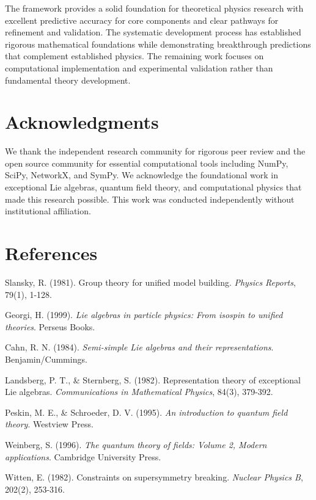 \documentclass[12pt,a4paper]{article}
\begin{document}
\begin{itemize}
\begin{itemize}
The framework provides a solid foundation for theoretical physics research with excellent predictive accuracy for core components and clear pathways for refinement and validation. The systematic development process has established rigorous mathematical foundations while demonstrating breakthrough predictions that complement established physics. The remaining work focuses on computational implementation and experimental validation rather than fundamental theory development.

\section*{Acknowledgments}

We thank the independent research community for rigorous peer review and the open source community for essential computational tools including NumPy, SciPy, NetworkX, and SymPy. We acknowledge the foundational work in exceptional Lie algebras, quantum field theory, and computational physics that made this research possible. This work was conducted independently without institutional affiliation.

\section*{References}

\begin{thebibliography}{99}

 Slansky, R. (1981). Group theory for unified model building. \textit{Physics Reports}, 79(1), 1-128.

 Georgi, H. (1999). \textit{Lie algebras in particle physics: From isospin to unified theories}. Perseus Books.

 Cahn, R. N. (1984). \textit{Semi-simple Lie algebras and their representations}. Benjamin/Cummings.

 Landsberg, P. T., & Sternberg, S. (1982). Representation theory of exceptional Lie algebras. \textit{Communications in Mathematical Physics}, 84(3), 379-392.

 Peskin, M. E., & Schroeder, D. V. (1995). \textit{An introduction to quantum field theory}. Westview Press.

 Weinberg, S. (1996). \textit{The quantum theory of fields: Volume 2, Modern applications}. Cambridge University Press.

 Witten, E. (1982). Constraints on supersymmetry breaking. \textit{Nuclear Physics B}, 202(2), 253-316.


\end{thebibliography}
\end{itemize}
\end{itemize}
\end{document}
